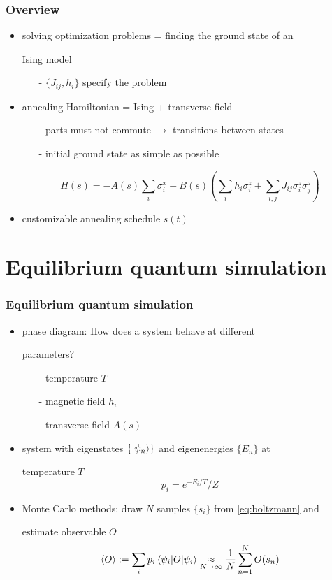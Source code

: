 \documentclass[11pt]{beamer}
\newcommand{\itemb}{\item[$\bullet$]}
\begin{document}
\begin{frame}
    \frametitle{Overview}    
    \begin{itemize}
        \setlength{\itemindent}{-1em}
        \itemb solving optimization problems = finding the ground state of an
        \item [] Ising model
        \begin{itemize}
            \setlength{\itemindent}{-1em}
            \item[-] $\{J_{ij}, h_i\}$ specify the problem
        \end{itemize}
        \itemb annealing Hamiltonian = Ising + transverse field
        \begin{itemize}
            \setlength{\itemindent}{-1em}
            \item [-] parts must not commute $\to$ transitions between states
            \item [-] initial ground state as simple as possible
        \end{itemize}
        \begin{equation*}
            H(s) = - A(s) \sum_i \sigma^x_i + B(s) \left( \sum_i h_i \sigma^z_i + \sum_{i,j} J_{ij} \sigma^z_i \sigma^z_j \right)
        \end{equation*}
        \itemb customizable annealing schedule $s(t)$
    \end{itemize}
\end{frame}


\section{Equilibrium quantum simulation}

\begin{frame}
    \frametitle{Equilibrium quantum simulation}
    \begin{itemize}
        \setlength{\itemindent}{-1em}
        \itemb phase diagram: How does a system behave at different
        \item [] parameters?
        \begin{itemize}
            \setlength{\itemindent}{-1em}
            \item [-] temperature $T$ 
            \item [-] magnetic field $h_i$
            \item [-] transverse field $A(s)$
        \end{itemize}
        \itemb system with eigenstates $\{\ket{\psi_n}\}$ and eigenenergies $\{E_n\}$ at
        \item [] temperature $T$
        \begin{equation}
            p_i = e^{-E_i/T} / Z
            \label{eq:boltzmann}
        \end{equation}
        \itemb Monte Carlo methods: draw $N$ samples $\{ s_i \}$ from \eqref{eq:boltzmann} and
        \item [] estimate observable $O$
        $$\expval{O} := \sum_i p_i \mel{\psi_i}{O}{\psi_i} \underset{N \to \infty}{\approx} \frac{1}{N} \sum_{n=1}^N O(s_n)$$
    \end{itemize}
\end{frame}
\end{document}

